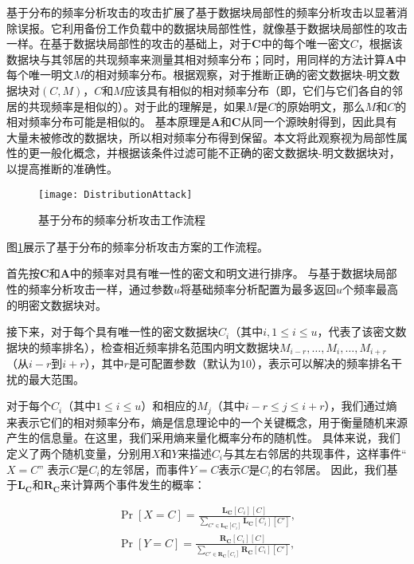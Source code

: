 基于分布的频率分析攻击的攻击扩展了基于数据块局部性的频率分析攻击\cite{li2017information}以显著消除误报。它利用备份工作负载中的数据块局部性性，就像基于数据块局部性的攻击一样。在基于数据块局部性的攻击的基础上，对于$\mathbf{C}$中的每个唯一密文$C$，根据该数据块与其邻居的共现频率来测量其相对频率分布；同时，用同样的方法计算$\mathbf{A}$中每个唯一明文$M$的相对频率分布。根据观察，对于推断正确的密文数据块-明文数据块对$(C,M)$，$C$和$M$应该具有相似的相对频率分布（即，它们与它们各自的邻居的共现频率是相似的）。对于此的理解是，如果$M$是$C$的原始明文，那么$M$和$C$的相对频率分布可能是相似的。 基本原理是$\mathbf{A}$和$\mathbf{C}$从同一个源映射得到，因此具有大量未被修改的数据块，所以相对频率分布得到保留。本文将此观察视为局部性属性的更一般化概念，并根据该条件过滤可能不正确的密文数据块-明文数据块对，以提高推断的准确性。

\begin{figure}[!htb]
    \small
    \centering
    \texttt{[image: DistributionAttack]}
    \caption{基于分布的频率分析攻击工作流程} 
    \label{fig:基于分布的频率分析攻击工作流程}
\end{figure}

图\ref{fig:基于分布的频率分析攻击工作流程}展示了基于分布的频率分析攻击方案的工作流程。

首先按$\mathbf{C}$和$\mathbf{A}$中的频率对具有唯一性的密文和明文进行排序。 与基于数据块局部性的频率分析攻击\cite{li2017information}一样，通过参数$u$将基础频率分析配置为最多返回$u$个频率最高的明密文数据块对。

接下来，对于每个具有唯一性的密文数据块$C_i$（其中$i, 1 \leq i \leq u$，代表了该密文数据块的频率排名），检查相近频率排名范围内明文数据块$M_{i-r}, \ldots, M_i, \ldots, M_{i+r}$（从$i-r$到$i+r$），其中$r$是可配置参数（默认为10），表示可以解决的频率排名干扰的最大范围。

对于每个$C_i$（其中$1 \leq i \leq u$）和相应的$M_j$（其中$i-r\le j\le i+r$），我们通过熵来表示它们的相对频率分布，熵是信息理论中的一个关键概念，用于衡量随机来源产生的信息量。在这里，我们采用熵来量化概率分布的随机性\cite{wang08}。 具体来说，我们定义了两个随机变量，分别用$X$和$Y$来描述$C_i$与其左右邻居的共现事件，这样事件“$X = C$” 表示$C$是$C_i$的左邻居，而事件$Y = C$表示$C$是$C_i$的右邻居。 因此，我们基于$\mathbf{L_C}$和$\mathbf{R_C}$来计算两个事件发生的概率：

\begin{eqnarray}
    \Pr[X = C] = \frac{\mathbf{L_C}[C_i][C]}{\sum_{C' \in \mathbf{L_C}[C_i]} \mathbf{L_C}[C_i][C']}, \nonumber \\
    \Pr[Y = C] = \frac{\mathbf{R_C}[C_i][C]}{\sum_{C' \in \mathbf{R_C}[C_i]} \mathbf{R_C}[C_i][C']}, \nonumber
\end{eqnarray}

